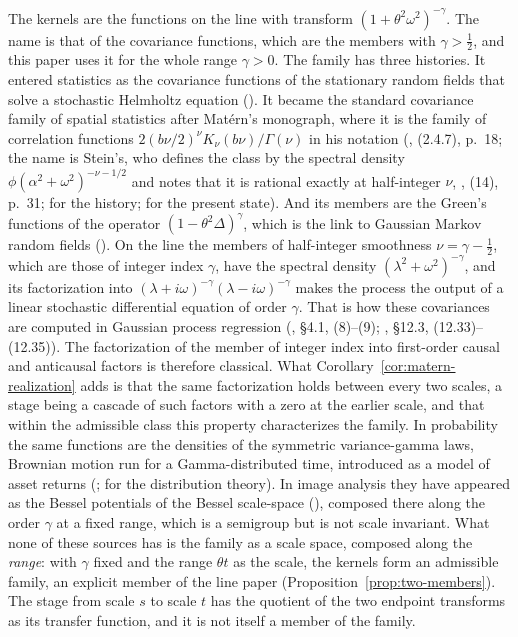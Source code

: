 The \Matern{} kernels are the functions on the line with transform
$(1 + \theta^2\omega^2)^{-\gamma}$. The name is that of the covariance functions, which are the
members with $\gamma > \tfrac12$, and this paper uses it for the whole range $\gamma > 0$. The
family has three histories. It entered statistics as the covariance functions of the
stationary random fields that solve a stochastic Helmholtz equation
(). It became the standard covariance family of spatial
statistics after Mat\'ern's monograph, where it is the family of correlation functions
$2(b\nu/2)^\nu K_\nu(b\nu)/\Gamma(\nu)$ in his notation (, (2.4.7),
p.~18; the name is Stein's, who defines the class by the spectral density
$\phi(\alpha^2 + \omega^2)^{-\nu - 1/2}$ and notes that it is rational exactly at half-integer
$\nu$, , (14), p.~31;  for the history;  for the present
state). And its members are the Green's functions of the operator
$(1 - \theta^2\Delta)^\gamma$, which is the link to Gaussian Markov random fields
(). On the line the members of half-integer smoothness
$\nu = \gamma - \tfrac12$, which are those of integer index $\gamma$, have the spectral density
$(\lambda^2 + \omega^2)^{-\gamma}$, and its factorization into
$(\lambda + i\omega)^{-\gamma}(\lambda - i\omega)^{-\gamma}$ makes the process the output of a
linear stochastic differential equation of order $\gamma$. That is how these covariances are
computed in Gaussian process regression (, \S 4.1, (8)--(9);
, \S 12.3, (12.33)--(12.35)). The factorization of the member of
integer index into first-order causal and anticausal factors is therefore classical. What
Corollary~\ref{cor:matern-realization} adds is that the same factorization holds between every
two scales, a stage being a cascade of such factors with a zero at the earlier scale, and that
within the admissible class this property characterizes the family. In probability the same
functions are the densities of the symmetric variance-gamma laws, Brownian motion run for a
Gamma-distributed time, introduced as a model of asset returns (;
 for the distribution theory). In image analysis they have
appeared as the Bessel potentials of the Bessel scale-space (),
composed there along the order $\gamma$ at a fixed range, which is a semigroup but is not
scale invariant. What none of these sources has is the family as a scale space, composed along
the \emph{range}: with $\gamma$ fixed and the range $\theta t$ as the scale, the kernels form
an admissible family, an explicit member of the line paper
(Proposition~\ref{prop:two-members}). The stage from scale $s$ to scale $t$ has the quotient
of the two endpoint transforms as its transfer function, and it is not itself a member of the
family.

